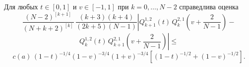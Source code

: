 \documentclass[12pt]{book}
\begin{document}
\begin{lemma}\label{lemma2}
Для любых $t \in [0, 1]$ и $v \in [-1,1]$ при $k=0, \ldots, N-2$ справедлива оценка
\begin{equation*}
\frac{(N-2)^{[k+1]}}{(N+k+2)^{[k]}}  \,
   \frac{(k+3)(k+4)}{(2k+5)(N-1)}
   \left|
        Q^{1,2}_{k+1}(t) \,Q^{2,1}_{k}\left(v +\frac{2}{N-1} \right) -
        \right.
\end{equation*}
\begin{equation*}
\left.
        Q^{1,2}_{k}(t) \, Q^{2,1}_{k+1} \left(v +\frac{2}{N-1} \right)
   \right|
   \leq
\end{equation*}
\begin{equation}\label{lem2eq}
 c(a) \, (1-t)^{-1/4} (1-v)^{-3/4}(1+v)^{-3/4} \left[
    (1-t)^{-1/2} +
    (1-v)^{-1/2}
    \right].
\end{equation}
\end{lemma}
\end{document}
